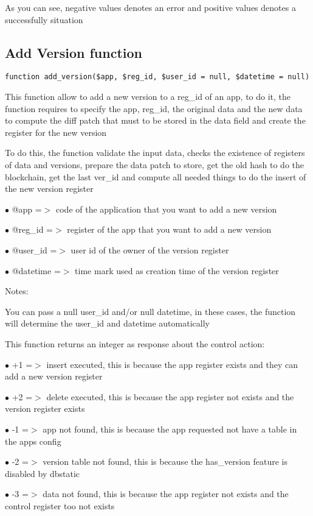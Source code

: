 \documentclass[a4paper]{book}
\begin{document}
As you can see, negative values denotes an error and positive values denotes a successfully situation

\hypertarget{toc59}{}
\subsection{Add Version function}

\begin{lstlisting}
function add_version($app, $reg_id, $user_id = null, $datetime = null)
\end{lstlisting}

This function allow to add a new version to a reg\_id of an app, to do it,
the function requires to specify the app, reg\_id, the original data and
the new data to compute the diff patch that must to be stored in the data
field and create the register for the new version

To do this, the function validate the input data, checks the existence
of registers of data and versions, prepare the data patch to store, get
the old hash to do the blockchain, get the last ver\_id and compute all
needed things to do the insert of the new version register

\begin{compactitem}
\item[\color{myblue}$\bullet$] @app      =$>$ code of the application that you want to add a new version
\item[\color{myblue}$\bullet$] @reg\_id   =$>$ register of the app that you want to add a new version
\item[\color{myblue}$\bullet$] @user\_id  =$>$ user id of the owner of the version register
\item[\color{myblue}$\bullet$] @datetime =$>$ time mark used as creation time of the version register
\end{compactitem}

Notes:

You can pass a null user\_id and/or null datetime, in these cases, the
function will determine the user\_id and datetime automatically

This function returns an integer as response about the control action:

\begin{compactitem}
\item[\color{myblue}$\bullet$] +1 =$>$ insert executed, this is because the app register exists and they can add a new version register
\item[\color{myblue}$\bullet$] +2 =$>$ delete executed, this is because the app register not exists and the version register exists
\item[\color{myblue}$\bullet$] -1 =$>$ app not found, this is because the app requested not have a table in the apps config
\item[\color{myblue}$\bullet$] -2 =$>$ version table not found, this is because the has\_version feature is disabled by dbstatic
\item[\color{myblue}$\bullet$] -3 =$>$ data not found, this is because the app register not exists and the control register too not exists
\end{compactitem}
\end{document}
